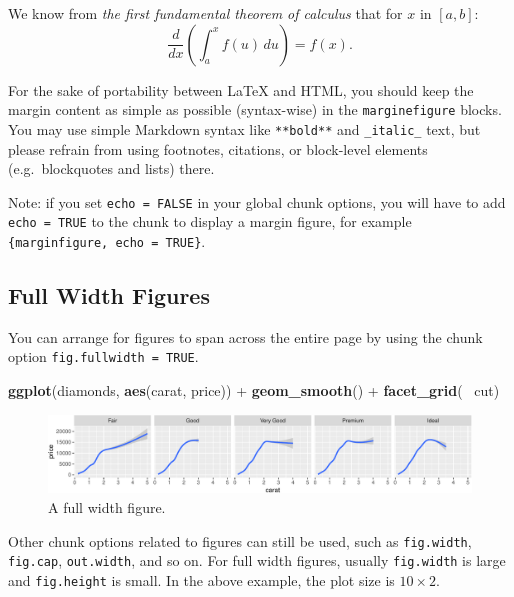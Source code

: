 \documentclass[]{tufte-handout}
\newenvironment{Shaded}{}{}
\newcommand{\KeywordTok}[1]{\textcolor[rgb]{0.00,0.44,0.13}{\textbf{#1}}}
\newcommand{\StringTok}[1]{\textcolor[rgb]{0.25,0.44,0.63}{#1}}
\newcommand{\OperatorTok}[1]{\textcolor[rgb]{0.40,0.40,0.40}{#1}}
\newcommand{\NormalTok}[1]{#1}
\begin{document}
\begin{marginfigure}
We know from \emph{the first fundamental theorem of calculus} that for
\(x\) in \([a, b]\):
\[\frac{d}{dx}\left( \int_{a}^{x} f(u)\,du\right)=f(x).\]
\end{marginfigure}

For the sake of portability between LaTeX and HTML, you should keep the
margin content as simple as possible (syntax-wise) in the
\texttt{marginefigure} blocks. You may use simple Markdown syntax like
\texttt{**bold**} and \texttt{\_italic\_} text, but please refrain from
using footnotes, citations, or block-level elements (e.g.~blockquotes
and lists) there.

Note: if you set \texttt{echo\ =\ FALSE} in your global chunk options,
you will have to add \texttt{echo\ =\ TRUE} to the chunk to display a
margin figure, for example
\texttt{\textasciigrave{}\textasciigrave{}\textasciigrave{}\{marginfigure,\ echo\ =\ TRUE\}}.

\subsection{Full Width Figures}\label{full-width-figures}

You can arrange for figures to span across the entire page by using the
chunk option \texttt{fig.fullwidth\ =\ TRUE}.

\begin{Shaded}
\begin{Highlighting}[]
\KeywordTok{ggplot}\NormalTok{(diamonds, }\KeywordTok{aes}\NormalTok{(carat, price)) }\OperatorTok{+}\StringTok{ }\KeywordTok{geom_smooth}\NormalTok{() }\OperatorTok{+}
\StringTok{  }\KeywordTok{facet_grid}\NormalTok{(}\OperatorTok{~}\StringTok{ }\NormalTok{cut)}
\end{Highlighting}
\end{Shaded}

\begin{figure}
\includegraphics{handout-twitter-analysis_files/figure-latex/fig-fullwidth-1} \caption[A full width figure]{A full width figure.}\label{fig:fig-fullwidth}
\end{figure}

Other chunk options related to figures can still be used, such as
\texttt{fig.width}, \texttt{fig.cap}, \texttt{out.width}, and so on. For
full width figures, usually \texttt{fig.width} is large and
\texttt{fig.height} is small. In the above example, the plot size is
\(10 \times 2\).
\end{document}
